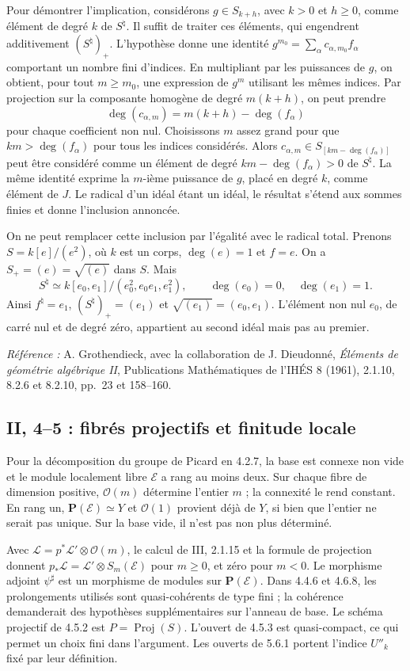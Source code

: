 Pour démontrer l'implication, considérons $g\in S_{k+h}$,
avec $k>0$ et $h\geq0$, comme élément de degré $k$ de
$S^\natural$. Il suffit de traiter ces éléments, qui engendrent
additivement $(S^\natural)_+$. L'hypothèse donne une identité
$g^{m_0}=\sum_\alpha c_{\alpha,m_0}f_\alpha$ comportant un
nombre fini d'indices. En multipliant par les puissances de $g$,
on obtient, pour tout $m\geq m_0$, une expression de $g^m$
utilisant les mêmes indices. Par projection sur la composante
homogène de degré $m(k+h)$, on peut prendre
\[
 \deg(c_{\alpha,m})=m(k+h)-\deg(f_\alpha)
\]
pour chaque coefficient non nul. Choisissons $m$ assez grand
pour que $km>\deg(f_\alpha)$ pour tous les indices considérés.
Alors $c_{\alpha,m}\in S_{[km-\deg(f_\alpha)]}$ peut être
considéré comme un élément de degré $km-\deg(f_\alpha)>0$
de $S^\natural$. La même identité exprime la $m$-ième
puissance de $g$, placé en degré $k$, comme élément de $J$.
Le radical d'un idéal étant un idéal, le résultat s'étend aux
sommes finies et donne l'inclusion annoncée.

On ne peut remplacer cette inclusion par l'égalité avec le
radical total. Prenons $S=k[e]/(e^2)$, où $k$ est un corps,
$\deg(e)=1$ et $f=e$. On a $S_+=(e)=\sqrt{(e)}$ dans $S$.
Mais
\[
 S^\natural\simeq k[e_0,e_1]/(e_0^2,e_0e_1,e_1^2),
 \qquad \deg(e_0)=0,\quad\deg(e_1)=1.
\]
Ainsi $f^\natural=e_1$, $(S^\natural)_+=(e_1)$ et
$\sqrt{(e_1)}=(e_0,e_1)$. L'élément non nul $e_0$, de carré
nul et de degré zéro, appartient au second idéal mais pas au
premier.

\noindent\emph{Référence :} A. Grothendieck, avec la collaboration
de J. Dieudonné, \emph{Éléments de géométrie algébrique II},
Publications Mathématiques de l'IHÉS 8 (1961), 2.1.10,
8.2.6 et 8.2.10, pp.~23 et 158--160.


\subsection{II, 4--5 : fibrés projectifs et finitude locale}
\label{note:base2-projective}
Pour la décomposition du groupe de Picard en 4.2.7, la base est
connexe non vide et le module localement libre $\mathcal E$ a
rang au moins deux. Sur chaque fibre de dimension positive,
$\mathcal O(m)$ détermine l'entier $m$ ; la connexité le rend
constant. En rang un, $\mathbf P(\mathcal E)\simeq Y$ et
$\mathcal O(1)$ provient déjà de $Y$, si bien que l'entier ne serait
pas unique. Sur la base vide, il n'est pas non plus déterminé.

Avec $\mathcal L=p^*\mathcal L'\otimes\mathcal O(m)$,
le calcul de III, 2.1.15 et la formule de projection donnent
$p_*\mathcal L=\mathcal L'\otimes S_m(\mathcal E)$ pour $m\geq0$,
et zéro pour $m<0$. Le morphisme adjoint $\psi^\sharp$ est un
morphisme de modules sur $\mathbf P(\mathcal E)$.
Dans 4.4.6 et 4.6.8, les prolongements utilisés sont
quasi-cohérents de type fini ; la cohérence demanderait des
hypothèses supplémentaires sur l'anneau de base.
Le schéma projectif de 4.5.2 est $P=\operatorname{Proj}(S)$.
L'ouvert de 4.5.3 est quasi-compact, ce qui permet un choix fini
dans l'argument. Les ouverts de 5.6.1 portent l'indice $U''_k$
fixé par leur définition.

